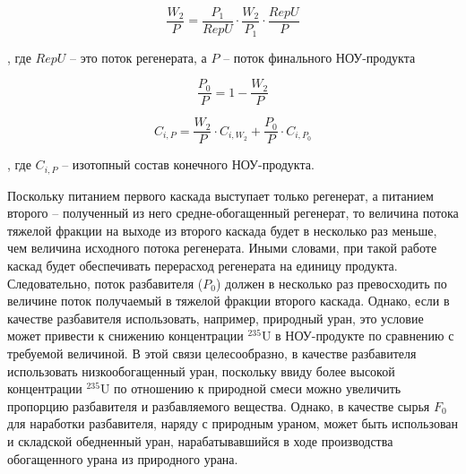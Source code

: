 \begin{equation}
    \label{dc1}
    \frac{W_{2}}{P}=\frac{P_{1}}{RepU}\cdot\frac{W_{2}}{P_{1}}\cdot\frac{RepU}{P}
  \end{equation}

, где $RepU$ -- это поток регенерата, а $P$ -- поток финального НОУ-продукта

\begin{equation}
    \label{dc2}
    \frac{P_{0}}{P} = 1 - \frac{W_{2}}{P}
\end{equation}

\begin{equation}
    \label{dc3}
    C_{i,P}=\frac{W_{2}}{P}\cdot C_{i,W_{2}}  + \frac{P_{0}}{P}\cdot C_{i,P_{0}}
\end{equation}

, где $C_{i,P}$ -- изотопный состав конечного НОУ-продукта.


Поскольку питанием первого каскада выступает только регенерат, а питанием второго -- полученный из него средне-обогащенный регенерат, то величина потока тяжелой фракции на выходе из второго каскада будет в несколько раз меньше, чем величина исходного потока регенерата. Иными словами, при такой работе каскад будет обеспечивать перерасход регенерата на единицу продукта. Следовательно, поток разбавителя ($P_{0}$) должен в несколько раз превосходить по величине поток получаемый в тяжелой фракции второго каскада. Однако, если в качестве разбавителя использовать, например, природный уран, это условие может привести к снижению концентрации $^{235}$U в НОУ-продукте по сравнению с требуемой величиной. В этой связи целесообразно, в качестве разбавителя использовать низкообогащенный уран, поскольку ввиду более высокой концентрации $^{235}$U по отношению к природной смеси можно увеличить пропорцию разбавителя и разбавляемого вещества. Однако, в качестве сырья $F_0$ для наработки разбавителя, наряду с природным ураном, может быть использован и складской обедненный уран, нарабатывавшийся в ходе производства обогащенного урана из природного урана. 


